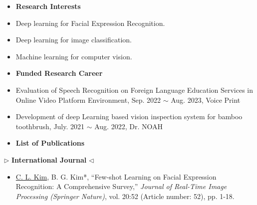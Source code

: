 \newpage
\pagestyle{empty}
\begin{itemize}
\item[\Large $\dagger$] {\Large \textbf{Research Interests}}
\end{itemize}
\normalsize
\begin{itemize}
    \item[$\triangleright$] Deep learning for Facial Expression Recognition.
    \item[$\triangleright$] Deep learning for image classification.
    \item[$\triangleright$] Machine learning for computer vision.
\end{itemize}
\begin{itemize}
\vspace*{0.7cm} \item[\Large $\dagger$] {\Large \textbf{Funded Research Career}}
\end{itemize}
\normalsize
\begin{itemize}
    \item[$\triangleright$] Evaluation of Speech Recognition on Foreign Language Education Services in Online Video Platform Environment, Sep. 2022 $\sim$ Aug. 2023, Voice Print
    \item[$\triangleright$] Development of deep Learning based vision inspection system for bamboo toothbrush, July. 2021 $\sim$ Aug. 2022, Dr. NOAH
\end{itemize}
 \clearpage
\begin{itemize}
 \item[\Large $\dagger$] {\Large
\textbf{List of Publications}}
\end{itemize}


\vspace*{0.3cm}
\begin{center}
$\triangleright$ \large{\bf{International Journal}}
$\triangleleft$
\end{center}
\begin{itemize}
\normalsize 
\item \underline{C. L. Kim}, B. G. Kim*, “Few-shot Learning on Facial Expression Recognition: A Comprehensive Survey,” \textit{Journal of Real-Time Image Processing (Springer Nature)}, vol. 20:52 (Article number: 52), pp. 1-18.





\end{itemize}

